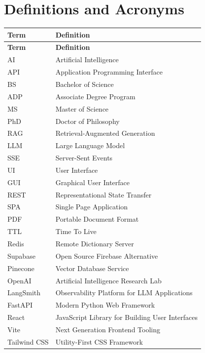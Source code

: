 \documentclass[12pt,a4paper]{book}
\numberwithin{table}{chapter}
\numberwithin{figure}{chapter}
\numberwithin{equation}{chapter}
\begin{document}
\section{Definitions and Acronyms}

\begin{longtable}{|p{2in}|p{4in}|}
\hline
\textbf{Term} & \textbf{Definition}\\
\hline
\endfirsthead
\hline
\textbf{Term} & \textbf{Definition}\\
\hline
\endhead
\hline
AI & Artificial Intelligence\\
\hline
API & Application Programming Interface\\
\hline
BS & Bachelor of Science\\
\hline
ADP & Associate Degree Program\\
\hline
MS & Master of Science\\
\hline
PhD & Doctor of Philosophy\\
\hline
RAG & Retrieval-Augmented Generation\\
\hline
LLM & Large Language Model\\
\hline
SSE & Server-Sent Events\\
\hline
UI & User Interface\\
\hline
GUI & Graphical User Interface\\
\hline
REST & Representational State Transfer\\
\hline
SPA & Single Page Application\\
\hline
PDF & Portable Document Format\\
\hline
TTL & Time To Live\\
\hline
Redis & Remote Dictionary Server\\
\hline
Supabase & Open Source Firebase Alternative\\
\hline
Pinecone & Vector Database Service\\
\hline
OpenAI & Artificial Intelligence Research Lab\\
\hline
LangSmith & Observability Platform for LLM Applications\\
\hline
FastAPI & Modern Python Web Framework\\
\hline
React & JavaScript Library for Building User Interfaces\\
\hline
Vite & Next Generation Frontend Tooling\\
\hline
Tailwind CSS & Utility-First CSS Framework\\
\hline
\end{longtable}
\end{document}
